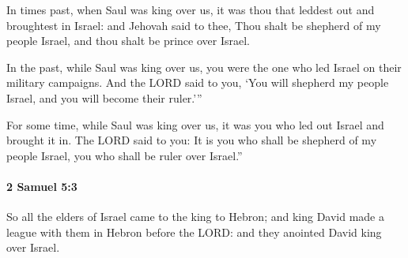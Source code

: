 			\begin{versebox}
					\item[BHS] 
					\item[ASV] In times past, when Saul was king over us, it was thou that leddest out and broughtest in Israel: and Jehovah said to thee, Thou shalt be shepherd of my people Israel, and thou shalt be prince over Israel.
					\item[NIV] In the past, while Saul was king over us, you were the one who led Israel on their military campaigns. And the LORD said to you, ‘You will shepherd my people Israel, and you will become their ruler.’”
					\item[NRSV] For some time, while Saul was king over us, it was you who led out Israel and brought it in. The LORD said to you: It is you who shall be shepherd of my people Israel, you who shall be ruler over Israel.”
			\end{versebox}

		\paragraph{2 Samuel 5:3} %
			\label{2SAMUEL-5-3}

			So all the elders of Israel came to the king to Hebron; and king David made a league with them in Hebron before the LORD: and they anointed David king over Israel.

